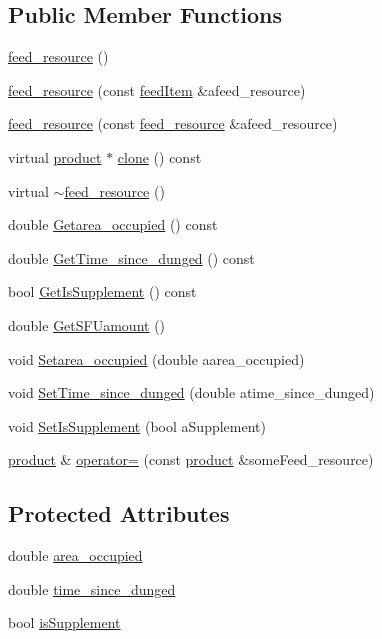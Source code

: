 \subsection*{Public Member Functions}
\begin{DoxyCompactItemize}
\item 
\hyperlink{classfeed__resource_a2a10168a7c126d7ebc6d48518d7f8b8f}{feed\_\-resource} ()
\item 
\hyperlink{classfeed__resource_a3d6f9eaddaf2e64f71e72d9a4d21a0a7}{feed\_\-resource} (const \hyperlink{classfeed_item}{feedItem} \&afeed\_\-resource)
\item 
\hyperlink{classfeed__resource_a6a2054dc5b99a5c6eb1383677c8dd299}{feed\_\-resource} (const \hyperlink{classfeed__resource}{feed\_\-resource} \&afeed\_\-resource)
\item 
virtual \hyperlink{classproduct}{product} $\ast$ \hyperlink{classfeed__resource_ab5b47b60feeca736e185b15a5125836a}{clone} () const 
\item 
virtual \hyperlink{classfeed__resource_a24d140b370338432017a15350f763846}{$\sim$feed\_\-resource} ()
\item 
double \hyperlink{classfeed__resource_ab215e26134aa4e9a7fa1f9231a9383a9}{Getarea\_\-occupied} () const 
\item 
double \hyperlink{classfeed__resource_a522cc52c960d9fc6bceb3bd173504a09}{GetTime\_\-since\_\-dunged} () const 
\item 
bool \hyperlink{classfeed__resource_ac5177e819867cf7f0d958bd033fdc696}{GetIsSupplement} () const 
\item 
double \hyperlink{classfeed__resource_acf098bd410e8170e2bbd82be48b2bf40}{GetSFUamount} ()
\item 
void \hyperlink{classfeed__resource_ada9004283f3b592ee9eaebbdfc197190}{Setarea\_\-occupied} (double aarea\_\-occupied)
\item 
void \hyperlink{classfeed__resource_aa4e28811ee99f8445de3b899b6613137}{SetTime\_\-since\_\-dunged} (double atime\_\-since\_\-dunged)
\item 
void \hyperlink{classfeed__resource_a94266da551778acc0c29f514e161ac50}{SetIsSupplement} (bool aSupplement)
\item 
\hyperlink{classproduct}{product} \& \hyperlink{classfeed__resource_af85c55e18f378ff9f64c962450237989}{operator=} (const \hyperlink{classproduct}{product} \&someFeed\_\-resource)
\end{DoxyCompactItemize}
\subsection*{Protected Attributes}
\begin{DoxyCompactItemize}
\item 
double \hyperlink{classfeed__resource_a0cd3064360d82f46a86fd6ef695838d6}{area\_\-occupied}
\item 
double \hyperlink{classfeed__resource_af20b1c8f5518da8da058da89f8e7d9f5}{time\_\-since\_\-dunged}
\item 
bool \hyperlink{classfeed__resource_a5ededcdd1769b409b7d30c86c1a09cd1}{isSupplement}
\end{DoxyCompactItemize}
